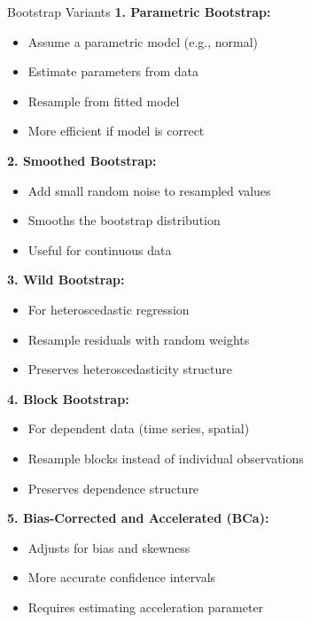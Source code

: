 \documentclass[aspectratio=169]{beamer}
\begin{document}
\begin{frame}{Bootstrap Variants}
\scriptsize
\textbf{1. Parametric Bootstrap:}
\begin{itemize}
    \item Assume a parametric model (e.g., normal)
    \item Estimate parameters from data
    \item Resample from fitted model
    \item More efficient if model is correct
\end{itemize}

\vspace{0.05cm}
\textbf{2. Smoothed Bootstrap:}
\begin{itemize}
    \item Add small random noise to resampled values
    \item Smooths the bootstrap distribution
    \item Useful for continuous data
\end{itemize}

\vspace{0.05cm}
\textbf{3. Wild Bootstrap:}
\begin{itemize}
    \item For heteroscedastic regression
    \item Resample residuals with random weights
    \item Preserves heteroscedasticity structure
\end{itemize}

\vspace{0.05cm}
\textbf{4. Block Bootstrap:}
\begin{itemize}
    \item For dependent data (time series, spatial)
    \item Resample blocks instead of individual observations
    \item Preserves dependence structure
\end{itemize}

\vspace{0.05cm}
\textbf{5. Bias-Corrected and Accelerated (BCa):}
\begin{itemize}
    \item Adjusts for bias and skewness
    \item More accurate confidence intervals
    \item Requires estimating acceleration parameter
\end{itemize}
\end{frame}
\end{document}
